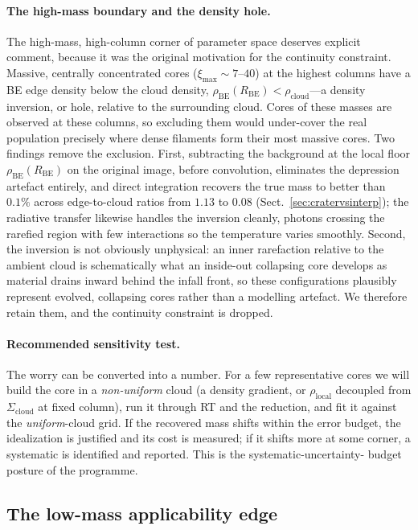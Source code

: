 \documentclass[11pt,a4paper]{article}
\newcommand{\Rbe}{R_{\mathrm{BE}}}
\newcommand{\ximax}{\xi_{\mathrm{max}}}
\newcommand{\Scloud}{\Sigma_{\mathrm{cloud}}}
\newcommand{\rhocloud}{\rho_{\mathrm{cloud}}}
\begin{document}
\paragraph{The high-mass boundary and the density hole.}
The high-mass, high-column corner of parameter space deserves explicit
comment, because it was the original motivation for the continuity constraint.
Massive, centrally concentrated cores ($\ximax\sim7$--$40$) at the highest
columns have a BE edge density below the cloud density,
$\rho_{\mathrm{BE}}(\Rbe)<\rhocloud$---a density inversion, or hole, relative
to the surrounding cloud. Cores of these masses are observed at these columns,
so excluding them would under-cover the real population precisely where dense
filaments form their most massive cores. Two findings remove the exclusion.
First, subtracting the background at the local floor $\rho_{\mathrm{BE}}(\Rbe)$
on the original image, before convolution, eliminates the depression artefact
entirely, and direct integration recovers the true mass to better than
$0.1\%$ across edge-to-cloud ratios from $1.13$ to $0.08$
(Sect.~\ref{sec:cratervsinterp}); the radiative transfer likewise handles the
inversion cleanly, photons crossing the rarefied region with few interactions
so the temperature varies smoothly. Second, the inversion is not obviously
unphysical: an inner rarefaction relative to the ambient cloud is
schematically what an inside-out collapsing core develops as material drains
inward behind the infall front, so these configurations plausibly represent
evolved, collapsing cores rather than a modelling artefact. We therefore
retain them, and the continuity constraint is dropped.

\paragraph{Recommended sensitivity test.}
The worry can be converted into a number. For a few representative cores we
will build the core in a \emph{non-uniform} cloud (a density gradient, or
$\rho_{\mathrm{local}}$ decoupled from $\Scloud$ at fixed column), run it
through RT and the reduction, and fit it against the \emph{uniform}-cloud
grid. If the recovered mass shifts within the error budget, the idealization
is justified and its cost is measured; if it shifts more at some corner, a
systematic is identified and reported. This is the systematic-uncertainty-
budget posture of the programme.

\subsection{The low-mass applicability edge}
\label{sec:edge}
\end{document}

